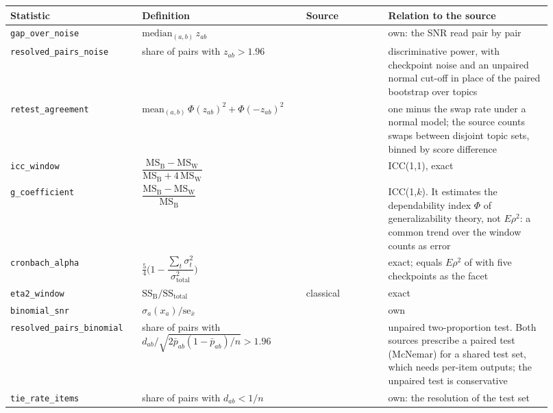 \begin{table}[h]
\centering
\scriptsize
\begin{tabular}{@{}p{0.215\linewidth}p{0.28\linewidth}p{0.14\linewidth}p{0.285\linewidth}@{}}
\toprule
\textbf{Statistic} & \textbf{Definition} & \textbf{Source} & \textbf{Relation to the source} \\
\midrule
\texttt{gap\_over\_noise} & $\mathrm{median}_{(a,b)}\, z_{ab}$ & \citet{heineman_signal_2025} & own: the SNR read pair by pair \\
\texttt{resolved\_pairs\_noise} & share of pairs with $z_{ab} > 1.96$ & \citet{sakai_evaluating_2006} & discriminative power, with checkpoint noise and an unpaired normal cut-off in place of the paired bootstrap over topics \\
\texttt{retest\_agreement} & $\mathrm{mean}_{(a,b)}\,\Phi(z_{ab})^2 + \Phi(-z_{ab})^2$ & \citet{voorhees_effect_2002} & one minus the swap rate under a normal model; the source counts swaps between disjoint topic sets, binned by score difference \\
\texttt{icc\_window} & $\dfrac{\mathrm{MS_B} - \mathrm{MS_W}}{\mathrm{MS_B} + 4\,\mathrm{MS_W}}$ & \citet{shrout_intraclass_1979} & ICC(1,1), exact \\
\texttt{g\_coefficient} & $\dfrac{\mathrm{MS_B} - \mathrm{MS_W}}{\mathrm{MS_B}}$ & \citet{bodoff_test_2007, urbano_measurement_2013} & ICC(1,$k$). It estimates the dependability index $\Phi$ of generalizability theory, not $E\rho^2$: a common trend over the window counts as error \\
\texttt{cronbach\_alpha} & $\frac{5}{4}\Big(1 - \dfrac{\sum_t \sigma^2_t}{\sigma^2_{\text{total}}}\Big)$ & \citet{cronbach_coefficient_1951} & exact; equals $E\rho^2$ of \citet{urbano_measurement_2013} with five checkpoints as the facet \\
\texttt{eta2\_window} & $\mathrm{SS_B}/\mathrm{SS_{total}}$ & classical & exact \\
\texttt{binomial\_snr} & $\sigma_a(x_a)/\mathrm{se}_{\bar{x}}$ & \citet{card_little_2020, miller_adding_2024} & own \\
\texttt{resolved\_pairs\_binomial} & share of pairs with $d_{ab}/\sqrt{2\bar{p}_{ab}(1-\bar{p}_{ab})/n} > 1.96$ & \citet{card_little_2020, dror_hitchhikers_2018} & unpaired two-proportion test. Both sources prescribe a paired test (McNemar) for a shared test set, which needs per-item outputs; the unpaired test is conservative \\
\texttt{tie\_rate\_items} & share of pairs with $d_{ab} < 1/n$ & \citet{schaeffer_are_2023} & own: the resolution of the test set \\

\end{tabular}
\end{table}
